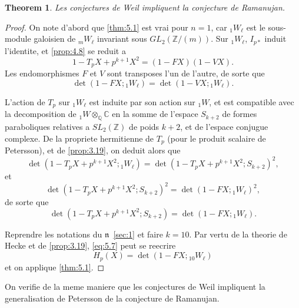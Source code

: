 \documentclass[11pt,reqno]{amsart}
\theoremstyle{plain}
\newtheorem{theorem}{Theorem}[section]
\theoremstyle{remark}
\newcommand{\Z}{\mathbb{Z}}
\newcommand{\Q}{\mathbb{Q}}
\newcommand{\C}{\mathbb{C}}
\numberwithin{equation}{section}
\begin{document}
\begin{theorem}\label{thm:5.6}
Les conjectures de Weil impliquent la conjecture de Ramanujan.
\end{theorem}

\begin{proof}
On note d'abord que \ref{thm:5.1} est vrai pour $n = 1$, car ${}_1W_\ell$ est le sous-module galoisien de ${}_mW_\ell$ invariant sous $GL_2(\Z/(m))$. Sur ${}_1W_\ell$, $I_{p*}$ induit l'identite, et \ref{prop:4.8} se reduit a
\[
1 - T_pX + p^{k+1}X^2 = (1 - FX)(1 - VX).
\]
Les endomorphismes $F$ et $V$ sont transposes l'un de l'autre, de sorte que
\[
\det(1 - FX; {}_1W_\ell) = \det(1 - VX; {}_1W_\ell).
\]

L'action de $T_p$ sur ${}_1W_\ell$ est induite par son action sur ${}_1W$, et est compatible avec la decomposition de ${}_1W \otimes_\Q \C$ en la somme de l'espace $S_{k+2}$ de formes paraboliques relatives a $SL_2(\Z)$ de poids $k+2$, et de l'espace conjugue complexe. De la propriete hermitienne de $T_p$ (pour le produit scalaire de Petersson), et de \ref{prop:3.19}, on deduit alors que
\[
\det(1 - T_pX + p^{k+1}X^2; {}_1W_\ell) = \det(1 - T_pX + p^{k+1}X^2; S_{k+2})^2,
\]
et
\[
\det(1 - T_pX + p^{k+1}X^2; S_{k+2})^2 = \det(1 - FX; {}_1W_\ell)^2,
\]
de sorte que
\begin{equation}\label{eq:5.7}
\det(1 - T_pX + p^{k+1}X^2; S_{k+2}) = \det(1 - FX; {}_1W_\ell).
\end{equation}

Reprendre les notations du $\mathfrak{n}$~\ref{sec:1} et faire $k = 10$. Par vertu de la theorie de Hecke et de \ref{prop:3.19}, \eqref{eq:5.7} peut se reecrire
\[
H_p(X) = \det(1 - FX; {}_{10}W_\ell)
\]
et on applique \ref{thm:5.1}.
\end{proof}

On verifie de la meme maniere que les conjectures de Weil impliquent la generalisation de Petersson de la conjecture de Ramanujan.
\end{document}
